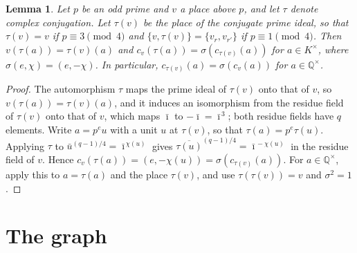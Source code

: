 \documentclass[11pt]{article}
\newtheorem{lemma}[theorem]{Lemma}
\newcommand{\Q}{\mathbb{Q}}
\begin{document}
\begin{lemma}\label{lem:conj}
Let $p$ be an odd prime and $v$ a place above $p$, and let $\tau$ denote complex conjugation. Let $\tau(v)$ be the place of the conjugate prime ideal, so that $\tau(v)=v$ if $p\equiv3\pmod4$ and $\{v,\tau(v)\}=\{v_r,v_{r'}\}$ if $p\equiv1\pmod4$. Then $v(\tau(a))=\tau(v)(a)$ and $c_v(\tau(a))=\sigma(c_{\tau(v)}(a))$ for $a\in K^\times$, where $\sigma(e,\chi)=(e,-\chi)$. In particular, $c_{\tau(v)}(a)=\sigma(c_v(a))$ for $a\in\Q^\times$.
\end{lemma}

\begin{proof}
The automorphism $\tau$ maps the prime ideal of $\tau(v)$ onto that of $v$, so $v(\tau(a))=\tau(v)(a)$, and it induces an isomorphism from the residue field of $\tau(v)$ onto that of $v$, which maps $\bar\imath$ to $-\bar\imath=\bar\imath^{\,3}$; both residue fields have $q$ elements. Write $a=p^eu$ with a unit $u$ at $\tau(v)$, so that $\tau(a)=p^e\tau(u)$. Applying $\tau$ to $\bar u^{(q-1)/4}=\bar\imath^{\,\chi(u)}$ gives $\overline{\tau(u)}^{(q-1)/4}=\bar\imath^{\,-\chi(u)}$ in the residue field of $v$. Hence $c_v(\tau(a))=(e,-\chi(u))=\sigma(c_{\tau(v)}(a))$. For $a\in\Q^\times$, apply this to $a=\tau(a)$ and the place $\tau(v)$, and use $\tau(\tau(v))=v$ and $\sigma^2=1$.
\end{proof}
\section{The graph}\label{sec:graph}
\end{document}

